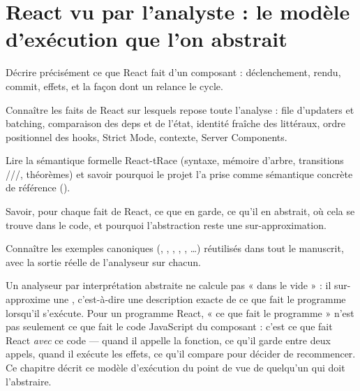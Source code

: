 \chapter{React vu par l'analyste : le modèle d'exécution que l'on abstrait}
\label{chap:react-modele}

\begin{objectifs}
  \item Décrire précisément ce que React fait d'un composant : déclenchement,
    rendu, commit, effets, et la façon dont un  relance le cycle.
  \item Connaître les faits de React sur lesquels repose toute l'analyse :
    file d'updaters et batching, comparaison  des deps et de
    l'état, identité fraîche des littéraux, ordre positionnel des hooks,
    Strict Mode, contexte, Server Components.
  \item Lire la sémantique formelle React-tRace (syntaxe, mémoire d'arbre,
    transitions ///,
    théorèmes) et savoir pourquoi le projet l'a prise comme sémantique concrète
    de référence ().
  \item Savoir, pour chaque fait de React, ce que \reactant{} en garde, ce qu'il
    en abstrait, où cela se trouve dans le code, et pourquoi l'abstraction
    reste une sur-approximation.
  \item Connaître les exemples canoniques (, ,
    , , , \dots) réutilisés dans
    tout le manuscrit, avec la sortie réelle de l'analyseur sur chacun.
\end{objectifs}


Un analyseur par interprétation abstraite ne calcule pas « dans le vide » : il
sur-approxime une , c'est-à-dire une description
exacte de ce que fait le programme lorsqu'il s'exécute. Pour un programme React,
« ce que fait le programme » n'est pas seulement ce que fait le code JavaScript
du composant : c'est ce que fait React \emph{avec} ce code --- quand il appelle la
fonction, ce qu'il garde entre deux appels, quand il exécute les effets, ce qu'il
compare pour décider de recommencer. Ce chapitre décrit ce modèle d'exécution du
point de vue de quelqu'un qui doit l'abstraire.


